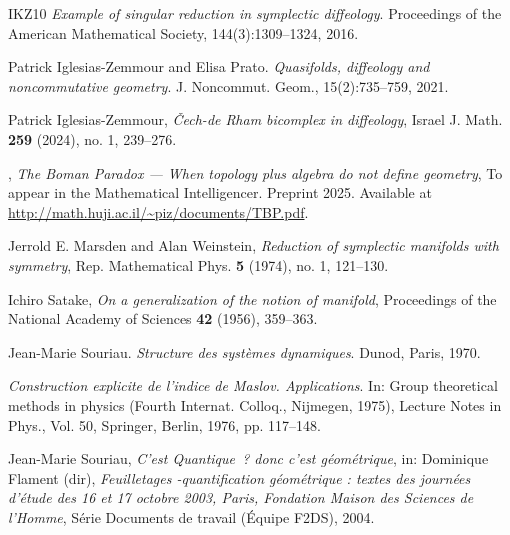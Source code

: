 \begin{thebibliography}{IKZ10}
    \bysame
    {\em Example of singular reduction in symplectic diffeology}.
    Proceedings of the American Mathematical Society, 144(3):1309--1324, 2016.
    
    Patrick Iglesias-Zemmour and Elisa Prato.
    {\em Quasifolds, diffeology and noncommutative geometry}.
    J. Noncommut. Geom., 15(2):735--759, 2021.
    
    Patrick Iglesias-Zemmour,
    \emph{{\v C}ech-de Rham bicomplex in diffeology},
    Israel J. Math. \textbf{259} (2024), no. 1, 239--276.
    
    \bysame,
    \emph{The Boman Paradox --- When topology plus algebra do not define geometry},
    To appear in the Mathematical Intelligencer. Preprint 2025. Available at \url{http://math.huji.ac.il/~piz/documents/TBP.pdf}.
    
    Jerrold E. Marsden and Alan Weinstein,
    \emph{Reduction of symplectic manifolds with symmetry},
    Rep. Mathematical Phys. \textbf{5} (1974), no. 1, 121--130.
    
    Ichiro Satake,
    \emph{On a generalization of the notion of manifold},
    Proceedings of the National Academy of Sciences \textbf{42} (1956), 359--363.
    
    Jean-Marie Souriau.
    {\em Structure des syst\`emes dynamiques}.
    Dunod, Paris, 1970.
    
    \bysame %
    \newblock \emph{Construction explicite de l'indice de Maslov. Applications}.
    \newblock In: Group theoretical methods in physics (Fourth Internat. Colloq., Nijmegen, 1975), Lecture Notes in Phys., Vol. 50, Springer, Berlin, 1976, pp. 117--148.
    
    Jean-Marie Souriau,
    \emph{C’est Quantique~? donc c’est géométrique},
    in: Dominique Flament (dir),
    \emph{Feuilletages -quantification géométrique : textes des journées d’étude des 16 et 17 octobre 2003, Paris, Fondation Maison des Sciences de l’Homme},
    Série Documents de travail (Équipe F2DS), 2004.
    
  \end{thebibliography}
  
  
  

